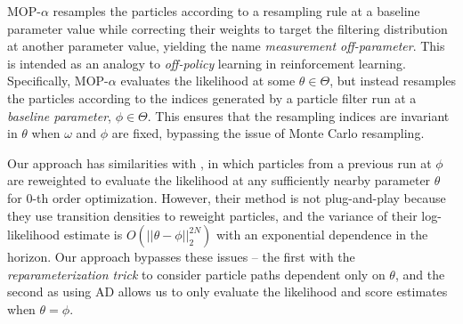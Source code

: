 \documentclass[9pt,twocolumn,pnasresearcharticle]{pnas-new}
\begin{document}
MOP-$\alpha$ resamples the particles according to a resampling rule at a baseline parameter value while correcting their weights to target the filtering distribution at another parameter value, yielding the name {\it measurement off-parameter}.
This is intended as an analogy to {\it off-policy} learning in reinforcement learning.
Specifically, MOP-$\alpha$ evaluates the likelihood at some $\theta \in \Theta$, but instead resamples the particles according to the indices generated by a particle filter run at a {\it baseline parameter}, $\phi \in \Theta$.
This ensures that the resampling indices are invariant in $\theta$ when $\omega$ and $\phi$ are fixed, bypassing the issue of Monte Carlo resampling.


Our approach has similarities with \cite{svensson18}, in which particles from a previous run at $\phi$ are reweighted to evaluate the likelihood at any sufficiently nearby parameter $\theta$ for $0$-th order optimization.
However, their method is not plug-and-play because they use transition densities to reweight particles, and the variance of their log-likelihood estimate is $O(||\theta - \phi||_2^{2N})$ with an exponential dependence in the horizon. Our approach bypasses these issues -- the first with the \textit{reparameterization trick} to consider particle paths dependent only on $\theta$, and the second as using AD allows us to only evaluate the likelihood and score estimates when $\theta=\phi$. 

\end{document}
